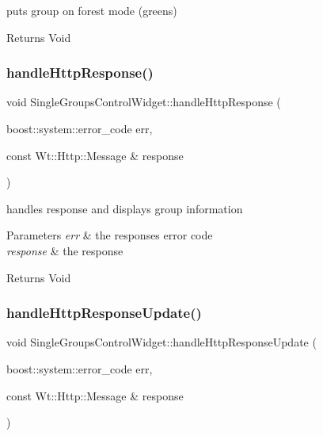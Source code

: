 puts group on forest mode (greens) 

\begin{DoxyReturn}{Returns}
Void 
\end{DoxyReturn}
\mbox{\label{class_single_groups_control_widget_a4aff4c45ad69e3fc391f89f14ecc1ebb}} 
\subsubsection{\texorpdfstring{handle\+Http\+Response()}{handleHttpResponse()}}
{\footnotesize\ttfamily void Single\+Groups\+Control\+Widget\+::handle\+Http\+Response (\begin{DoxyParamCaption}\item[{boost\+::system\+::error\+\_\+code}]{err,  }\item[{const Wt\+::\+Http\+::\+Message \&}]{response }\end{DoxyParamCaption})\hspace{0.3cm}{\ttfamily [private]}}



handles response and displays group information 


\begin{DoxyParams}{Parameters}
{\em err} & the response\textquotesingle{}s error code \\
\hline
{\em response} & the response \\
\hline
\end{DoxyParams}
\begin{DoxyReturn}{Returns}
Void 
\end{DoxyReturn}
\mbox{\label{class_single_groups_control_widget_a5049556fc39b63323ab534ba65e398e3}} 
\subsubsection{\texorpdfstring{handle\+Http\+Response\+Update()}{handleHttpResponseUpdate()}}
{\footnotesize\ttfamily void Single\+Groups\+Control\+Widget\+::handle\+Http\+Response\+Update (\begin{DoxyParamCaption}\item[{boost\+::system\+::error\+\_\+code}]{err,  }\item[{const Wt\+::\+Http\+::\+Message \&}]{response }\end{DoxyParamCaption})\hspace{0.3cm}{\ttfamily [private]}}



